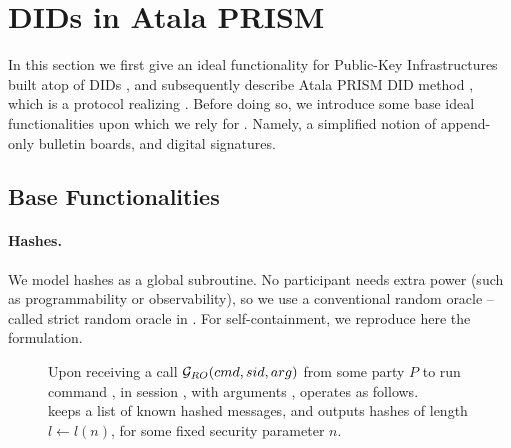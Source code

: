 \section{DIDs in Atala PRISM}
\label{sec:did-atala}

In this section we first give an ideal functionality for Public-Key
Infrastructures built atop of DIDs \IdealGPKIDID, and subsequently describe
Atala PRISM DID method \RealPKIDIDAtala, which is a protocol realizing
\IdealGPKIDID.
%
Before doing so, we introduce some base ideal functionalities upon which we
rely for \RealPKIDIDAtala. Namely, a simplified notion of append-only bulletin
boards, and digital signatures.

\subsection{Base Functionalities}
\label{ssec:did-funcs}


\paragraph{Hashes.} %
We model hashes as a global subroutine. No participant needs extra power (such
as programmability or observability), so we use a conventional random oracle --
called strict random oracle in \cite{cdg+18}. For self-containment, we reproduce
here the formulation.

\begin{figure}[ht]
  \begin{framed}
    \begin{minipage}[t]{\textwidth}
      \textrm{Upon receiving a call $\mathcal{G}_{RO}(cmd,sid,arg)$ from some party
        $P$ to run command \cmd, in session \sid, with arguments \arg,
        \IdealGRO operates as follows.} \\
      \textrm{\IdealGRO keeps a list \hashlist of known hashed messages, and
        outputs hashes of length $l \gets l(n)$, for some fixed security
        parameter $n$.}
    \end{minipage}
    \vspace*{0.5em}
    
    \centering
  \end{framed}
\end{figure}

